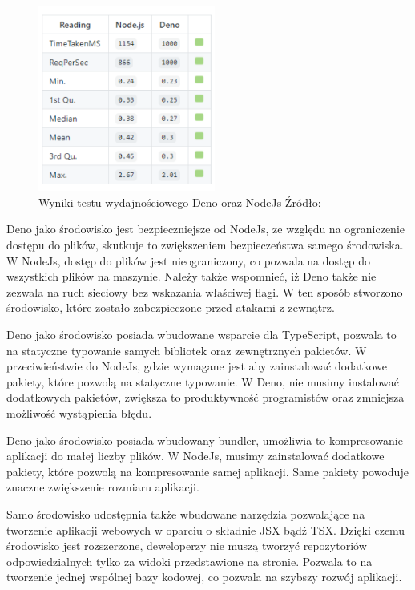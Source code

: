 \begin{figure}[H]
  \centering
  \includegraphics[width=0.52\textwidth]{Figures/deno_performance.png}
  \caption{Wyniki testu wydajnościowego Deno oraz NodeJs Źródło: \cite{deno_performance}}
  \label{fig:deno_vs_node}
\end{figure}

Deno jako środowisko jest bezpieczniejsze od NodeJs, ze względu na ograniczenie dostępu do plików, skutkuje to zwiększeniem bezpieczeństwa samego środowiska. W NodeJs, dostęp do plików jest nieograniczony, co pozwala na dostęp do wszystkich plików na maszynie. Należy także wspomnieć, iż Deno także nie zezwala na ruch sieciowy bez wskazania właściwej flagi. W ten sposób stworzono środowisko, które zostało zabezpieczone przed atakami z zewnątrz.

Deno jako środowisko posiada wbudowane wsparcie dla TypeScript, pozwala to na statyczne typowanie samych bibliotek oraz zewnętrznych pakietów. W przeciwieństwie do NodeJs, gdzie wymagane jest aby zainstalować dodatkowe pakiety, które pozwolą na statyczne typowanie. W Deno, nie musimy instalować dodatkowych pakietów, zwiększa to produktywność programistów oraz zmniejsza możliwość wystąpienia błędu.

Deno jako środowisko posiada wbudowany bundler, umożliwia to kompresowanie aplikacji do małej liczby plików. W NodeJs, musimy zainstalować dodatkowe pakiety, które pozwolą na kompresowanie samej aplikacji. Same pakiety powoduje znaczne zwiększenie rozmiaru aplikacji.

Samo środowisko udostępnia także wbudowane narzędzia pozwalające na tworzenie aplikacji webowych w oparciu o składnie JSX bądź TSX. Dzięki czemu środowisko jest rozszerzone, deweloperzy nie muszą tworzyć repozytoriów odpowiedzialnych tylko za widoki przedstawione na stronie. Pozwala to na tworzenie jednej wspólnej bazy kodowej, co pozwala na szybszy rozwój aplikacji.

